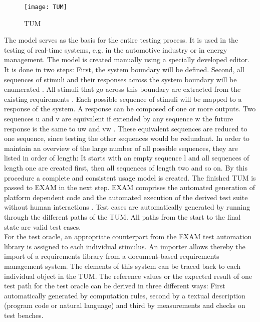 \begin{figure}[H]
\centering{}\texttt{[image: TUM]}\caption{TUM \cite{Siegl2010}}
\end{figure}
The model serves as the basis for the entire testing process. It is
used in the testing of real-time systems, e.g. in the automotive industry
or in energy management. The model is created manually using a specially
developed editor. \\
It is done in two steps: First, the system boundary will be defined.
Second, all sequences of stimuli and their responses across the system
boundary will be enumerated \cite{Siegl2010}. All stimuli that go
across this boundary are extracted from the existing requirements
\cite{Siegl2010}. Each possible sequence of stimuli will be mapped
to a response of the system. A response can be composed of one or
more outputs. \textquotedbl Two sequences u and v are equivalent if
extended by any sequence w the future response is the same to uw and
vw\textquotedbl{} \cite{Siegl2010}. These equivalent sequences are
reduced to one sequence, since testing the other sequences would be
redundant. In order to maintain an overview of the large number of
all possible sequences, they are listed in order of length: It starts
with an empty sequence \textgreek{l} and all sequences of length one
are created first, then all sequences of length two and so on. By
this procedure a complete and consistent usage model is created. The
finished TUM is passed to EXAM in the next step. \textquotedbl EXAM
comprises the automated generation of platform dependent code and
the automated execution of the derived test suite without human interactions\textquotedbl{}
\cite{Siegl2010}. Test cases are automatically generated by running
through the different paths of the TUM. All paths from the start to
the final state are valid test cases.\\
For the test oracle, an appropriate counterpart from the EXAM test
automation library is assigned to each individual stimulus. An importer
allows thereby the import of a requirements library from a document-based
requirements management system. The elements of this system can be
traced back to each individual object in the TUM. The reference values
or the expected result of one \textquotedbl test path\textquotedbl{}
for the test oracle can be derived in three different ways: First
automatically generated by computation rules, second by a textual
description (program code or natural language) and third by measurements
and checks on test benches.

